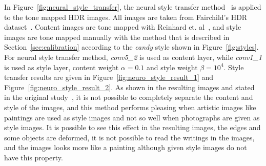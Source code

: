 In Figure~\ref{fig:neural_style_transfer}, the neural style transfer method~\cite{gatys2016image} is applied to the tone mapped HDR images. All images are taken from Fairchild's HDR dataset~\cite{fairchild2007hdr}. Content images are tone mapped with Reinhard et. al~\cite{reinhard2002photographic}, and style images are tone mapped manually with the method that is described in Section~\ref{sec:calibration} according to the \emph{candy} style shown in Figure~\ref{fig:styles}. For neural style transfer method, \emph{conv5\_2} is used as content layer, while \emph{conv1\_1} is used as style layer, content weight $\alpha = 0.1$ and style weight $\beta = 10^4$. Style transfer results are given in Figure~\ref{fig:neuro_style_result_1} and Figure~\ref{fig:neuro_style_result_2}. As shown in the resulting images and stated in the original study~\cite{gatys2016image}, it is not possible to completely separate the content and style of the images, and this method performs pleasing when artistic images like paintings are used as style images and not so well when photographs are given as style images. It is possible to see this effect in the resulting images, the edges and some objects are deformed, it is not possible to read the writings in the images, and the images looks more like a painting although given style images do not have this property.

